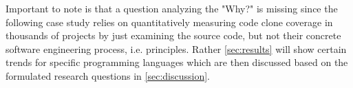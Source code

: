 Important to note is that a question analyzing the "Why?" is missing since the following case study relies on quantitatively measuring code clone coverage in thousands of projects by just examining the source code, but not their concrete software engineering process, i.e. principles. Rather \autoref{sec:results} will show certain trends for specific programming languages which are then discussed based on the formulated research questions in \autoref{sec:discussion}.